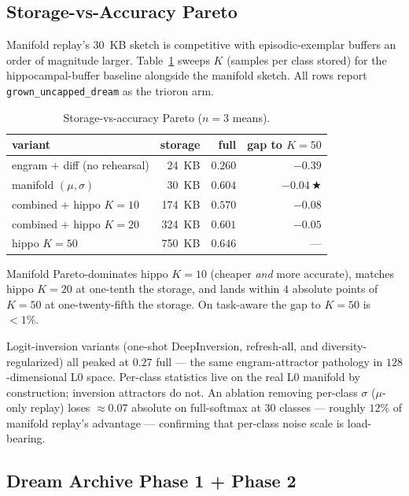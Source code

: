 \documentclass[11pt]{article}
\newcommand{\arm}[1]{\texttt{#1}}
\newcommand{\headline}{$\bigstar$}
\begin{document}
\subsection{Storage-vs-Accuracy Pareto}
\label{sec:pareto}

Manifold replay's 30~KB sketch is competitive with episodic-exemplar
buffers an order of magnitude larger.
Table~\ref{tab:pareto} sweeps $K$ (samples per class stored) for the
hippocampal-buffer baseline alongside the manifold sketch. All rows
report \arm{grown\_uncapped\_dream} as the trioron arm.

\begin{table}[h]
  \centering
  \caption{Storage-vs-accuracy Pareto ($n = 3$ means).}
  \label{tab:pareto}
  \begin{tabular}{lrrr}
    \toprule
    variant                          & storage   & full    & gap to $K = 50$ \\
    \midrule
    engram $+$ diff (no rehearsal)   & 24~KB     & $0.260$ & $-0.39$         \\
    manifold $(\mu, \sigma)$         & 30~KB     & $0.604$ & $-0.04$\,\headline \\
    combined $+$ hippo $K = 10$      & 174~KB    & $0.570$ & $-0.08$         \\
    combined $+$ hippo $K = 20$      & 324~KB    & $0.601$ & $-0.05$         \\
    hippo $K = 50$                   & 750~KB    & $0.646$ & ---             \\
    \bottomrule
  \end{tabular}
\end{table}

Manifold Pareto-dominates hippo $K = 10$ (cheaper \emph{and} more
accurate), matches hippo $K = 20$ at one-tenth the storage, and lands
within $4$ absolute points of $K = 50$ at one-twenty-fifth the storage.
On task-aware the gap to $K = 50$ is $< 1\%$.

Logit-inversion variants (one-shot DeepInversion, refresh-all, and
diversity-regularized) all peaked at $0.27$ full --- the same
engram-attractor pathology in $128$-dimensional L0 space. Per-class
statistics live on the real L0 manifold by construction; inversion
attractors do not. An ablation removing per-class $\sigma$ ($\mu$-only
replay) loses $\approx 0.07$ absolute on full-softmax at $30$ classes ---
roughly $12\%$ of manifold replay's advantage --- confirming that
per-class noise scale is load-bearing.

\subsection{Dream Archive Phase 1 + Phase 2}
\label{sec:archive-results}
\end{document}

